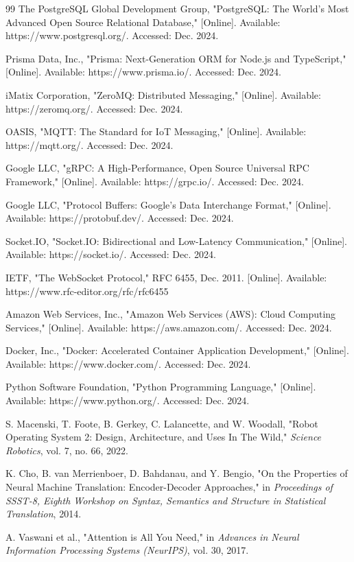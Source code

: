 \documentclass[conference]{IEEEtran}
\begin{document}
\begin{thebibliography}{99}
The PostgreSQL Global Development Group, "PostgreSQL: The World's Most Advanced Open Source Relational Database," [Online]. Available: https://www.postgresql.org/. Accessed: Dec. 2024.

Prisma Data, Inc., "Prisma: Next-Generation ORM for Node.js and TypeScript," [Online]. Available: https://www.prisma.io/. Accessed: Dec. 2024.

iMatix Corporation, "ZeroMQ: Distributed Messaging," [Online]. Available: https://zeromq.org/. Accessed: Dec. 2024.

OASIS, "MQTT: The Standard for IoT Messaging," [Online]. Available: https://mqtt.org/. Accessed: Dec. 2024.

Google LLC, "gRPC: A High-Performance, Open Source Universal RPC Framework," [Online]. Available: https://grpc.io/. Accessed: Dec. 2024.

Google LLC, "Protocol Buffers: Google's Data Interchange Format," [Online]. Available: https://protobuf.dev/. Accessed: Dec. 2024.

Socket.IO, "Socket.IO: Bidirectional and Low-Latency Communication," [Online]. Available: https://socket.io/. Accessed: Dec. 2024.

IETF, "The WebSocket Protocol," RFC 6455, Dec. 2011. [Online]. Available: https://www.rfc-editor.org/rfc/rfc6455

Amazon Web Services, Inc., "Amazon Web Services (AWS): Cloud Computing Services," [Online]. Available: https://aws.amazon.com/. Accessed: Dec. 2024.

Docker, Inc., "Docker: Accelerated Container Application Development," [Online]. Available: https://www.docker.com/. Accessed: Dec. 2024.

Python Software Foundation, "Python Programming Language," [Online]. Available: https://www.python.org/. Accessed: Dec. 2024.

S. Macenski, T. Foote, B. Gerkey, C. Lalancette, and W. Woodall, "Robot Operating System 2: Design, Architecture, and Uses In The Wild," \textit{Science Robotics}, vol. 7, no. 66, 2022.

K. Cho, B. van Merrienboer, D. Bahdanau, and Y. Bengio, "On the Properties of Neural Machine Translation: Encoder-Decoder Approaches," in \textit{Proceedings of SSST-8, Eighth Workshop on Syntax, Semantics and Structure in Statistical Translation}, 2014.

A. Vaswani et al., "Attention is All You Need," in \textit{Advances in Neural Information Processing Systems (NeurIPS)}, vol. 30, 2017.

\end{thebibliography}
\end{document}
